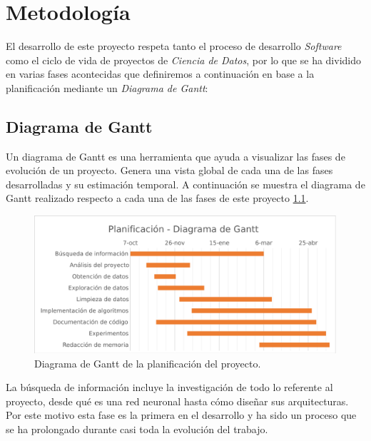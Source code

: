 
\chapter{Metodología}
\label{metodologia}

El desarrollo de este proyecto respeta tanto el proceso de desarrollo \textit{Software} como el ciclo de vida de proyectos de \textit{Ciencia de Datos}, por lo que se ha dividido en varias fases acontecidas que definiremos a continuación en base a la planificación mediante un \textit{Diagrama de Gantt}:

\section{Diagrama de Gantt}

    Un diagrama de Gantt es una herramienta que ayuda a visualizar las fases de evolución de un proyecto. Genera una vista global de cada una de las fases desarrolladas y su estimación temporal. A continuación se muestra el diagrama de Gantt realizado respecto a cada una de las fases de este proyecto \ref{GranttImage}.
    \begin{figure}[H]
        \centering
        \includegraphics[width=15cm]{archivos/4.Metodologia/GranttImage}
        \caption{Diagrama de Gantt de la planificación del proyecto.}
        \label{GranttImage}
    \end{figure}

    La búsqueda de información incluye la investigación de todo lo referente al proyecto, desde qué es una red neuronal hasta cómo diseñar sus arquitecturas. Por este motivo esta fase es la primera en el desarrollo y ha  sido  un  proceso que se ha prolongado durante casi toda la evolución del trabajo.

